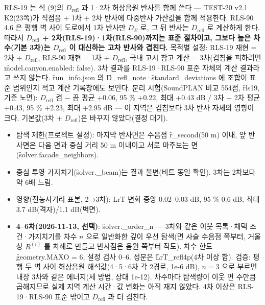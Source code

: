 \documentclass[10.5pt,a4paper]{article}
\begin{document}
 RLS-19 는 식 (9)의 $D_\mathrm{refl}$ 과 1·2차 허상음원 반사를 함께 쓴다 — TEST-20 v2.1 K2(23쪽)가 직접음 + 1차 + 2차 반사에 다중반사 가산값을 함께 적용한다. RLS-90 4.6 은 평행 벽 사이 도로에서 1차 반사만 $D_E$ 로, 그 뒤 반사는 $D_\mathrm{refl}$ 로 계산하게 한다. 따라서 \textbf{$D_\mathrm{refl}$ + 2차(RLS-19)·1차(RLS-90)까지는 표준 절차이고, 그보다 높은 차수(기본 3차)는 $D_\mathrm{refl}$ 이 대신하는 고차 반사와 겹친다.} 목적별 설정: RLS-19 재현 = 2차 + $D_\mathrm{refl}$, RLS-90 재현 = 1차 + $D_\mathrm{refl}$, 국내 고시 참고 계산 = 3차(겹침을 피하려면 \f{model.canyon.enabled: false}). 3차 결과를 RLS-19·RLS-90 표준 자체의 계산 결과라고 쓰지 않는다. \f{run\_info.json} 의 \f{D\_refl\_note}·\f{standard\_deviations} 에 조합이 표준 범위인지 적고 계산 기록창에도 보인다. 분리 시험(SoundPLAN 비교 554점, \f{rls19}, 기준 노면): $D_\mathrm{refl}$ 켬 − 끔 평균 +0.06, 95 \% +0.22, 최대 +0.43 dB / 3차 − 2차 평균 +0.43, 95 \% +2.23, 최대 +2.95 dB — 이 지역은 겹침보다 3차 반사 자체의 영향이 크다. 기본값(3차 + $D_\mathrm{refl}$)은 바꾸지 않았다(결정 대기).
\begin{itemize}
\item 탐색 제한(프로젝트 설정): 마지막 반사면은 수음점 \f{r\_second}(50 m) 이내, 앞 반사면은 다음 면과 중심 거리 50 m 이내이고 서로 마주보는 면(\f{solver.facade\_neighbors}).
\item 중심 투영 가지치기(\f{solver.\_beam})는 결과 불변(비트 동일 확인). 3차는 2차보다 약 6배 느림.
\item 영향(전농사거리 표본, 2→3차): LrT 변화 중앙 0.02–0.03 dB, 95 \% 0.6 dB, 최대 3.7 dB(격자)/1.1 dB(벽면).
\item \textbf{4–6차(2026-11-13, 선택)}: \f{solver.\_order\_n} — 3차와 같은 이웃 목록·채택 조건·가지치기를 차수 $n$ 으로 일반화한 깊이 우선 탐색(면 사슬 수음점 쪽부터, 거울상 $R^{(i)}$ 를 차례로 만들고 반사점은 음원 쪽부터 작도). 차수 한도 \f{geometry.MAXO} = 6, 설정 검사 0–6. 성분은 \f{LrT\_refl4p}(4차 이상 합). 검증: 평행 두 벽 사이 허상음원 해석값(4·5·6차 각 2경로, 1e-6 dB), $n = 3$ 으로 부르면 내장 3차와 같은 에너지(세 방법, 상대 1e-12). 차수마다 탐색량이 이웃 면 수만큼 곱해지므로 실제 지역 계산 시간·값 변화는 아직 재지 않았다. 4차 이상은 RLS-19·RLS-90 표준 밖이고 $D_\mathrm{refl}$ 과 더 겹친다.
\end{itemize}
\end{document}
